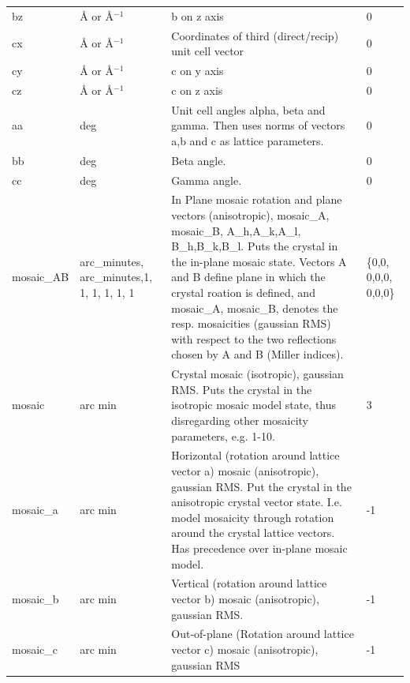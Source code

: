\begin{longtable}{p{}p{}p{}p{}}
bz & \AA{} or \AA{}$^{-1}$ & b on z axis & 0 \\
cx & \AA{} or \AA{}$^{-1}$ & Coordinates of third (direct/recip) unit cell vector & 0 \\
cy & \AA{} or \AA{}$^{-1}$ & c on y axis & 0 \\
cz & \AA{} or \AA{}$^{-1}$ & c on z axis & 0 \\
aa & deg & Unit cell angles alpha, beta and gamma. Then uses norms of vectors a,b and c as lattice parameters. & 0 \\
bb & deg & Beta angle. & 0 \\
cc & deg & Gamma angle. & 0 \\
mosaic\_AB & arc\_minutes, arc\_minutes,1, 1, 1, 1, 1, 1 & In Plane mosaic rotation and plane vectors (anisotropic), mosaic\_A, mosaic\_B, A\_h,A\_k,A\_l, B\_h,B\_k,B\_l. Puts the crystal in the in-plane mosaic state. Vectors A and B define plane in which  the crystal roation is defined, and mosaic\_A, mosaic\_B, denotes the resp. mosaicities (gaussian RMS) with respect to the two reflections chosen by A and B (Miller indices). & \{0,0, 0,0,0, 0,0,0\} \\
mosaic & arc min & Crystal mosaic (isotropic), gaussian RMS. Puts the crystal in the isotropic mosaic model state, thus disregarding other mosaicity parameters, e.g. 1-10. & 3 \\
mosaic\_a & arc min & Horizontal (rotation around lattice vector a) mosaic (anisotropic), gaussian RMS. Put the crystal in the anisotropic crystal vector state. I.e. model mosaicity through rotation around the crystal lattice vectors. Has precedence over in-plane mosaic model. & -1 \\
mosaic\_b & arc min & Vertical (rotation around lattice vector b) mosaic (anisotropic), gaussian RMS. & -1 \\
mosaic\_c & arc min & Out-of-plane (Rotation around lattice vector c) mosaic (anisotropic), gaussian RMS & -1 \\
\bottomrule
\end{longtable}

